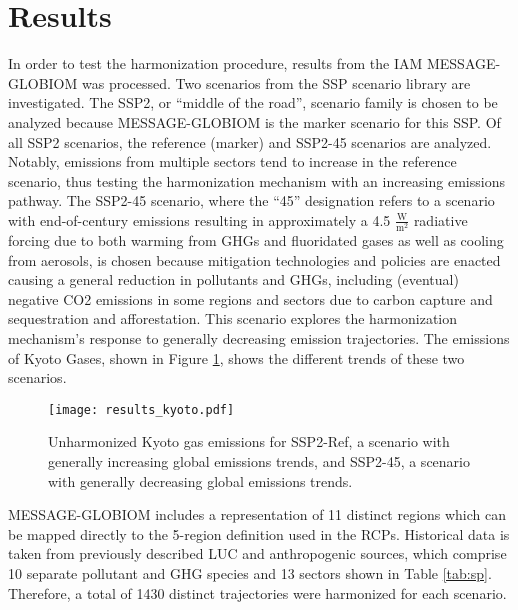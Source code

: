 \section{Results}\label{sec:results}

In order to test the  harmonization procedure, results from the IAM
MESSAGE-GLOBIOM \cite{fricko_marker_2017} was processed. Two scenarios from the
SSP scenario library \cite{Riahi2017153,Rao2017346} are investigated. The SSP2,
or ``middle of the road'', scenario family is chosen to be analyzed because
MESSAGE-GLOBIOM is the marker scenario for this SSP. Of all SSP2 scenarios, the
reference (marker) and SSP2-45 scenarios are analyzed. Notably, emissions from
multiple sectors tend to increase in the reference scenario, thus testing the
harmonization mechanism with an increasing emissions pathway. The SSP2-45
scenario, where the ``45'' designation refers to a scenario with end-of-century
emissions resulting in approximately a 4.5 $\frac{\text{W}}{\text{m}^2}$
radiative forcing due to both warming from GHGs and fluoridated gases as well as
cooling from aerosols, is chosen because mitigation technologies and policies
are enacted causing a general reduction in pollutants and GHGs, including
(eventual) negative CO2 emissions in some regions and sectors due to carbon
capture and sequestration and afforestation. This scenario explores the
harmonization mechanism's response to generally decreasing emission
trajectories. The emissions of Kyoto Gases, shown in Figure \ref{fig:kyoto},
shows the different trends of these two scenarios.


\begin{figure}
  \begin{center}
    \texttt{[image: results\_kyoto.pdf]}
    \caption[]{
      \label{fig:kyoto}
      Unharmonized Kyoto gas emissions for SSP2-Ref, a scenario with generally
      increasing global emissions trends, and SSP2-45, a scenario with generally
      decreasing global emissions trends.  }
  \end{center}
\end{figure}


MESSAGE-GLOBIOM includes a representation of 11 distinct regions which can be
mapped directly to the 5-region definition used in the RCPs. Historical data is
taken from previously described LUC and anthropogenic sources, which comprise 10
separate pollutant and GHG species and 13 sectors shown in Table
\ref{tab:sp}. Therefore, a total of 1430 distinct trajectories were harmonized
for each scenario.

